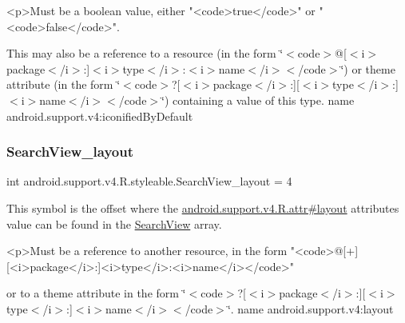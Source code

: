 \begin{DoxyVerb}      <p>Must be a boolean value, either "<code>true</code>" or "<code>false</code>".
\end{DoxyVerb}
 

This may also be a reference to a resource (in the form \char`\"{}$<$code$>$@\mbox{[}$<$i$>$package$<$/i$>$\+:\mbox{]}$<$i$>$type$<$/i$>$\+:$<$i$>$name$<$/i$>$$<$/code$>$\char`\"{}) or theme attribute (in the form \char`\"{}$<$code$>$?\mbox{[}$<$i$>$package$<$/i$>$\+:\mbox{]}\mbox{[}$<$i$>$type$<$/i$>$\+:\mbox{]}$<$i$>$name$<$/i$>$$<$/code$>$\char`\"{}) containing a value of this type.  name android.\+support.\+v4\+:iconified\+By\+Default \mbox{\label{classandroid_1_1support_1_1v4_1_1R_1_1styleable_a2df4c8970df3d39b8fca7d3605a3ac4d}} 
\subsubsection{\texorpdfstring{Search\+View\+\_\+layout}{SearchView\_layout}}
{\footnotesize\ttfamily int android.\+support.\+v4.\+R.\+styleable.\+Search\+View\+\_\+layout = 4\hspace{0.3cm}{\ttfamily [static]}}

This symbol is the offset where the \hyperlink{classandroid_1_1support_1_1v4_1_1R_1_1attr_a0bf2f94b527cc15b68bf05ba0e93849d}{android.\+support.\+v4.\+R.\+attr\#layout} attribute\textquotesingle{}s value can be found in the \hyperlink{classandroid_1_1support_1_1v4_1_1R_1_1styleable_a7f709410d566e9fd5d4c710e815c300a}{Search\+View} array.

\begin{DoxyVerb}      <p>Must be a reference to another resource, in the form "<code>@[+][<i>package</i>:]<i>type</i>:<i>name</i></code>"
\end{DoxyVerb}
 or to a theme attribute in the form \char`\"{}$<$code$>$?\mbox{[}$<$i$>$package$<$/i$>$\+:\mbox{]}\mbox{[}$<$i$>$type$<$/i$>$\+:\mbox{]}$<$i$>$name$<$/i$>$$<$/code$>$\char`\"{}.  name android.\+support.\+v4\+:layout \mbox{\label{classandroid_1_1support_1_1v4_1_1R_1_1styleable_ac2a79ceebc50d310a3dbad7676afab25}} 
